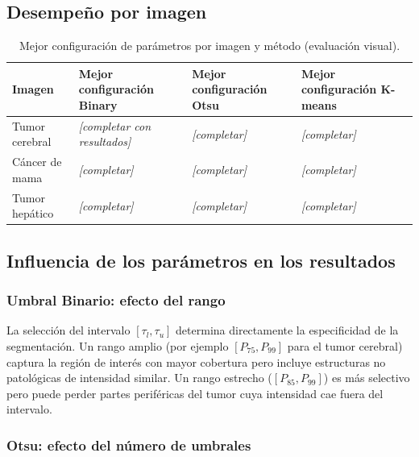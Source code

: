\documentclass[12pt, a4paper]{article}
\begin{document}
\subsection{Desempeño por imagen}

\begin{table}[H]
\centering
\renewcommand{\arraystretch}{1.5}
\begin{tabularx}{\textwidth}{lXXX}
\toprule
\textbf{Imagen} &
\textbf{Mejor configuración Binary} &
\textbf{Mejor configuración Otsu} &
\textbf{Mejor configuración K-means} \\
\midrule
Tumor cerebral &
\textit{[completar con resultados]} &
\textit{[completar]} &
\textit{[completar]} \\

Cáncer de mama &
\textit{[completar]} &
\textit{[completar]} &
\textit{[completar]} \\

Tumor hepático &
\textit{[completar]} &
\textit{[completar]} &
\textit{[completar]} \\
\bottomrule
\end{tabularx}
\caption{Mejor configuración de parámetros por imagen y método (evaluación visual).}
\label{tab:desempeno}
\end{table}

\subsection{Influencia de los parámetros en los resultados}

\subsubsection{Umbral Binario: efecto del rango}

La selección del intervalo $[\tau_l, \tau_u]$ determina directamente la especificidad de
la segmentación. Un rango amplio (por ejemplo $[P_{75}, P_{99}]$ para el tumor cerebral)
captura la región de interés con mayor cobertura pero incluye estructuras no patológicas
de intensidad similar. Un rango estrecho ($[P_{85}, P_{99}]$) es más selectivo pero puede
perder partes periféricas del tumor cuya intensidad cae fuera del intervalo.

\subsubsection{Otsu: efecto del número de umbrales}
\end{document}
